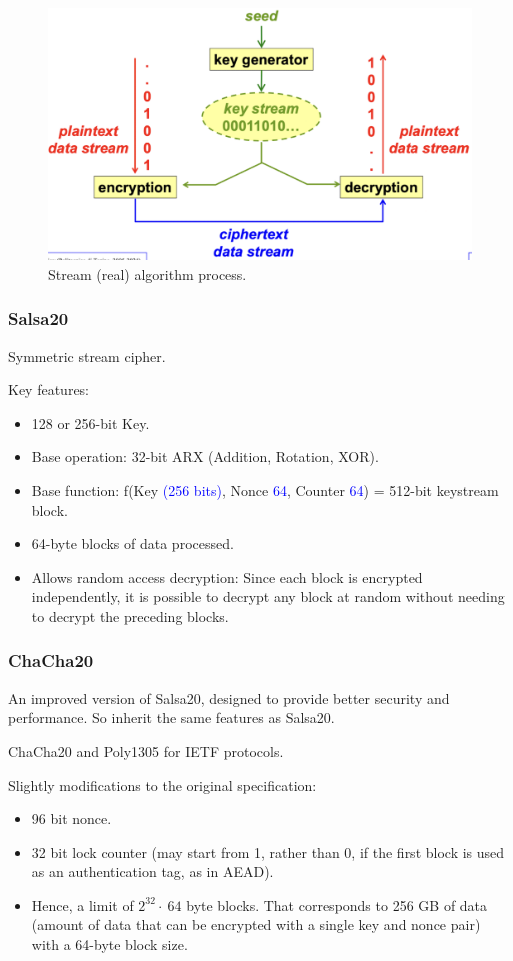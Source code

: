 \begin{figure}[H]
    \centering
    \includegraphics[width=0.8\linewidth]{Images/Cryptography/Stream_Cipher.png}
    \caption{Stream (real) algorithm process.}
\end{figure}

\subsubsection{Salsa20}
\begin{center}
Symmetric stream cipher.
\end{center}

Key features:
\begin{itemize}
    \item 128 or 256-bit Key.
    \item Base operation: 32-bit ARX (Addition, Rotation, XOR).
    \item Base function: f(Key \textcolor{Blue}{(256 bits)}, Nonce\textcolor{Blue}{ 64}, Counter\textcolor{Blue}{ 64}) = 512-bit keystream block.
    \item 64-byte blocks of data processed.
    \item Allows random access decryption: Since each block is encrypted independently, it is possible to decrypt any block at random without needing to decrypt the preceding blocks.
\end{itemize}
\subsubsection{ChaCha20}
An improved version of Salsa20, designed to provide better security and performance. So inherit the same features as Salsa20.
\begin{center}
    ChaCha20 and Poly1305 for IETF protocols.
\end{center}
Slightly modifications to the original specification:
\begin{itemize}
    \item 96 bit nonce.
    \item 32 bit lock counter (may start from 1, rather than 0, if the first block is used as an authentication tag, as in AEAD).
    \item Hence, a limit of $2^{32} \cdot \ 64$ byte blocks. That corresponds to 256 GB of data (amount of data that can be encrypted with a single key and nonce pair) with a 64-byte block size.
\end{itemize}

